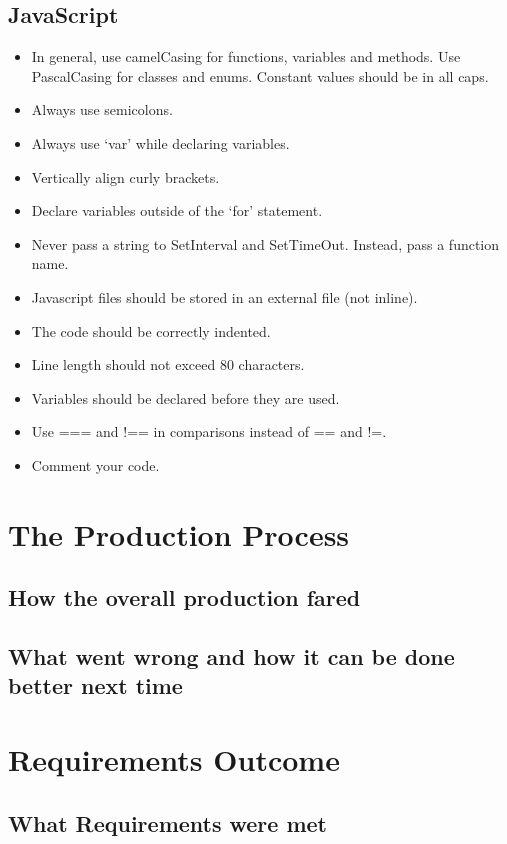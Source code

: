 \documentclass[paper=a4, fontsize=11pt]{scrartcl} %
\numberwithin{equation}{section} %
\numberwithin{figure}{section} %
\numberwithin{table}{section} %
\begin{document}
  \subsection{JavaScript}
  \begin{itemize}
    \item In general, use camelCasing for functions, variables and methods. Use PascalCasing for classes and enums. Constant values should be in all caps.
    \item Always use semicolons.
    \item Always use ‘var’ while declaring variables.
    \item Vertically align curly brackets.
    \item Declare variables outside of the ‘for’ statement.
    \item Never pass a string to SetInterval and SetTimeOut. Instead, pass a function name.
    \item Javascript files should be stored in an external file (not inline).
    \item The code should be correctly indented.
    \item Line length should not exceed 80 characters.
    \item Variables should be declared before they are used.
    \item Use === and !== in comparisons instead of == and !=.
    \item Comment your code.
    \end{itemize}
  

\section{The Production Process}
\subsection{How the overall production fared}
\subsection{What went wrong and how it can be done better next time
}

\section{Requirements Outcome}
\subsection{What Requirements were met}
\end{document}
